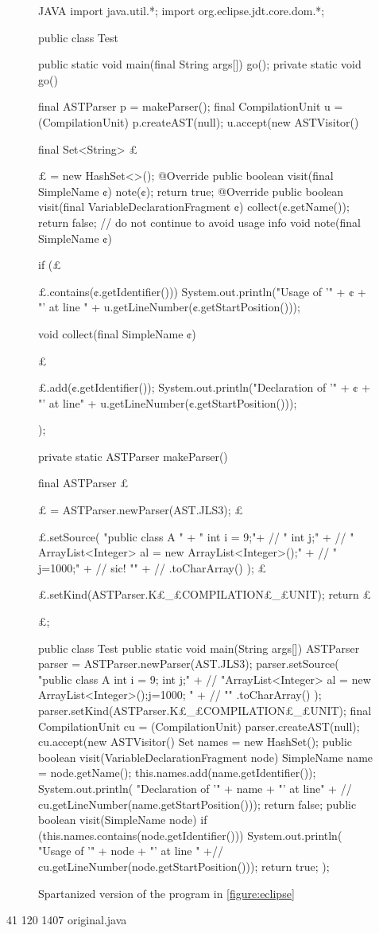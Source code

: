 \begin{figure}[H]
  \caption{Spartanized version of the program in \cref{figure:eclipse}}
  \label{figure:eclipse:spartan}
  \def\ignore#1{}
\begin{code}[listing style={numbered, language=Java},minipage,width=0.98\columnwidth]{JAVA}
import java.util.*;
import org.eclipse.jdt.core.dom.*;

public class Test {
  public static void main(final String args[]) {
    go();
  }
  private static void go() {
    final ASTParser p = makeParser();
    final CompilationUnit u = (CompilationUnit) p.createAST(null);
    u.accept(new ASTVisitor() {
      final Set<String> £\ignore$£$ = new HashSet<>();
      @Override public boolean visit(final SimpleName ¢) {
        note(¢);
        return true;
      }
      @Override public boolean visit(final VariableDeclarationFragment ¢) {
        collect(¢.getName());
        return false; // do not continue to avoid usage info
      }
      void note(final SimpleName ¢) {
        if (£\ignore$£$.contains(¢.getIdentifier()))
          System.out.println("Usage of '" + ¢ + "' at line " + u.getLineNumber(¢.getStartPosition()));
      }
      void collect(final SimpleName ¢) {
        £\ignore$£$.add(¢.getIdentifier());
        System.out.println("Declaration of '" + ¢ + "' at line" + u.getLineNumber(¢.getStartPosition()));
      }
    });
  }
  private static ASTParser makeParser() {
    final ASTParser £\ignore$£$ = ASTParser.newParser(AST.JLS3);
    £\ignore$£$.setSource(
      "public class A {\n" + 
      "  int i = 9;\n"+ //
      "  int j;\n" + //
      "  ArrayList<Integer> al = new ArrayList<Integer>();\n" + //
      "  j=1000;\n" + // sic!
      "}\n" + //
      .toCharArray()
    );
    £\ignore$£$.setKind(ASTParser.K£\_£COMPILATION£\_£UNIT);
    return £\ignore$£$;
  }
}
public class Test {
  public static void main(String args[]) {
    ASTParser parser = ASTParser.newParser(AST.JLS3);
    parser.setSource(
      "public class A { int i = 9;  \n int j;\n" + //
      "ArrayList<Integer> al = new ArrayList<Integer>();j=1000; }" + //
      ""
      .toCharArray()
    );
    parser.setKind(ASTParser.K£\_£COMPILATION£\_£UNIT);
    final CompilationUnit cu = (CompilationUnit) parser.createAST(null);
    cu.accept(new ASTVisitor() {
      Set names = new HashSet();
      public boolean visit(VariableDeclarationFragment node) {
        SimpleName name = node.getName();
        this.names.add(name.getIdentifier());
        System.out.println(
          "Declaration of '" + name + "' at line" + //
          cu.getLineNumber(name.getStartPosition()));
        return false; 
      }
      public boolean visit(SimpleName node) {
        if (this.names.contains(node.getIdentifier())) {
          System.out.println(
            "Usage of '" + node + "' at line " +//
            cu.getLineNumber(node.getStartPosition()));
        }
        return true;
      }
    });
  }
}
  \end{code}
\end{figure}
  41  120 1407 original.java

